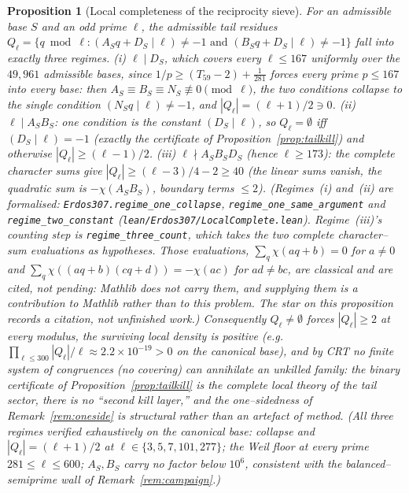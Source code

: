 \documentclass[11pt]{article}
\newtheorem{proposition}[theorem]{Proposition}
\theoremstyle{definition}
\begin{document}
\begin{proposition}[Local completeness of the reciprocity sieve]\label{prop:localcomplete}
For an admissible base $S$ and an odd prime $\ell$, the admissible tail residues
$Q_\ell=\{q\bmod\ell:(A_Sq+D_S\mid\ell)\ne-1\text{ and }(B_Sq+D_S\mid\ell)\ne-1\}$ fall into exactly three
regimes. \textup{(i)} $\ell\mid D_S$, which covers every $\ell\le167$ uniformly over the $49{,}961$
admissible bases, since $1/p\ge(T_{59}-2)+\tfrac1{281}$ forces every prime $p\le167$ into every base:
then $A_S\equiv B_S\equiv N_S\not\equiv0\pmod\ell$, the two conditions collapse to the single condition
$(N_Sq\mid\ell)\ne-1$, and $|Q_\ell|=(\ell+1)/2\ni0$. \textup{(ii)} $\ell\mid A_SB_S$: one condition is
the constant $(D_S\mid\ell)$, so $Q_\ell=\emptyset$ iff $(D_S\mid\ell)=-1$ (exactly the certificate of
Proposition~\ref{prop:tailkill}) and otherwise $|Q_\ell|\ge(\ell-1)/2$. \textup{(iii)}
$\ell\nmid A_SB_SD_S$ (hence $\ell\ge173$): the complete character sums give
$|Q_\ell|\ge(\ell-3)/4-2\ge40$ (the linear sums vanish, the quadratic sum is $-\chi(A_SB_S)$, boundary
terms $\le2$). \textup{(}Regimes~\textup{(i)} and~\textup{(ii)} are formalised:
\texttt{Erdos307.regime\_one\_collapse}, \texttt{regime\_one\_same\_argument} and
\texttt{regime\_two\_constant} \textup{(}\texttt{lean/Erdos307/LocalComplete.lean}\textup{)}.
Regime~\textup{(iii)}'s counting step is \texttt{regime\_three\_count}, which takes the two complete
character--sum evaluations as hypotheses. Those evaluations, $\sum_q\chi(aq+b)=0$ for $a\ne0$ and
$\sum_q\chi((aq+b)(cq+d))=-\chi(ac)$ for $ad\ne bc$, are classical and are \emph{cited}, not pending:
Mathlib does not carry them, and supplying them is a contribution to Mathlib rather than to this
problem. The star on this proposition records a citation, not unfinished work.\textup{)}
Consequently $Q_\ell\ne\emptyset$ forces $|Q_\ell|\ge2$ at every modulus, the surviving
local density is positive (e.g.\ $\prod_{\ell\le300}|Q_\ell|/\ell\approx2.2\times10^{-19}>0$ on the
canonical base), and by CRT \emph{no finite system of congruences (no covering) can annihilate an
unkilled family}: the binary certificate of Proposition~\ref{prop:tailkill} is the complete local theory
of the tail sector, there is no ``second kill layer,'' and the one--sidedness of
Remark~\ref{rem:oneside} is structural rather than an artefact of method. (All three regimes verified
exhaustively on the canonical base: collapse and $|Q_\ell|=(\ell+1)/2$ at
$\ell\in\{3,5,7,101,277\}$; the Weil floor at every prime $281\le\ell\le600$; $A_S,B_S$ carry no factor
below $10^6$, consistent with the balanced--semiprime wall of Remark~\ref{rem:campaign}.)
\end{proposition}
\end{document}
